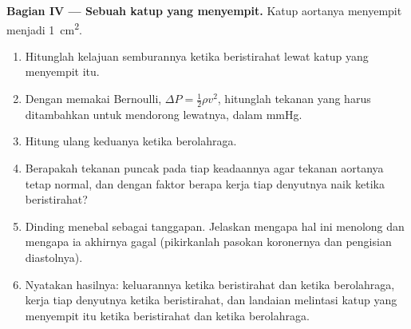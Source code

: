 \begin{problem}
\medskip
\noindent\textbf{Bagian IV --- Sebuah katup yang menyempit.}
Katup aortanya menyempit menjadi \qty{1}{cm^2}.
\begin{enumerate}[resume]
  \item Hitunglah kelajuan semburannya ketika beristirahat lewat katup
        yang menyempit itu.
  \item Dengan memakai Bernoulli, $\Delta P = \tfrac12\rho v^{2}$,
        hitunglah tekanan yang harus ditambahkan  untuk
        mendorong  lewatnya, dalam mmHg.
  \item Hitung ulang keduanya ketika berolahraga.
  \item Berapakah tekanan puncak  pada tiap keadaannya agar
        tekanan aortanya tetap normal, dan dengan faktor berapa kerja
        tiap denyutnya naik ketika beristirahat?
  \item Dinding  menebal sebagai tanggapan. Jelaskan mengapa
        hal ini menolong dan mengapa ia akhirnya gagal (pikirkanlah
        pasokan koronernya dan pengisian diastolnya).
  \item Nyatakan hasilnya: keluarannya ketika beristirahat dan ketika
        berolahraga, kerja tiap denyutnya ketika beristirahat, dan
        landaian melintasi katup yang menyempit itu ketika beristirahat
        dan ketika berolahraga.
\end{enumerate}
\end{problem}
